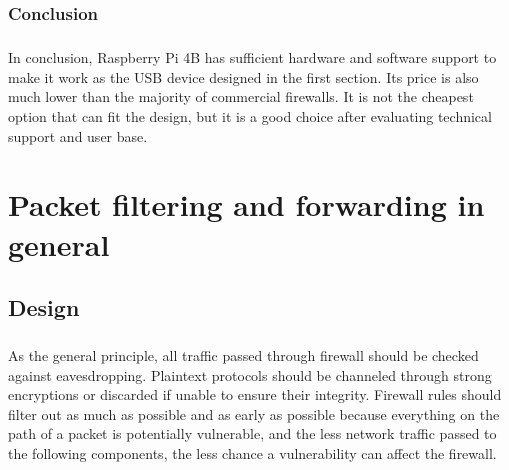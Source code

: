 \documentclass[mscthesis]{usiinfthesis}
\begin{document}
\subsection{Conclusion}
\paragraph{}
In conclusion, Raspberry Pi 4B has sufficient hardware and software support to make it work as the USB device designed in the first section. Its price is also much lower than the majority of commercial firewalls. It is not the cheapest option that can fit the design, but it is a good choice after evaluating technical support and user base.

\chapter{Packet filtering and forwarding in general}\label{cha:packet}
\section{Design}
\paragraph{}
As the general principle, all traffic passed through firewall should be checked against eavesdropping. Plaintext protocols should be channeled through strong encryptions or discarded if unable to ensure their integrity. Firewall rules should filter out as much as possible and as early as possible because everything on the path of a packet is potentially vulnerable, and the less network traffic passed to the following components, the less chance a vulnerability can affect the firewall.
\end{document}
